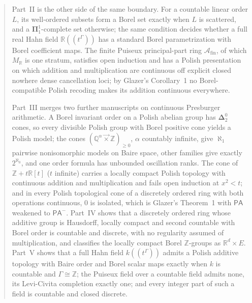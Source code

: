 \documentclass[11pt]{article}
\numberwithin{equation}{section}
\theoremstyle{definition}
\theoremstyle{remark}
\newcommand{\Z}{\mathbb Z}
\newcommand{\Q}{\mathbb Q}
\newcommand{\R}{\mathbb R}
\newcommand{\lex}{\mathbin{\overrightarrow\times}}
\newcommand{\MR}{M_{\R}}
\newcommand{\Dtwo}{\boldsymbol{\Delta}^{0}_{2}}
\newcommand{\A}{\mathcal A_{\mathrm{fin}}}
\begin{document}
\begin{titlepage}
\begin{minipage}{\textwidth}
\begin{abstract}
Part~II is the other side of the same boundary. For a countable linear
order $L$, its well-ordered subsets form a Borel set exactly when $L$ is
scattered, and a $\boldsymbol\Pi^1_1$-complete set otherwise; the same
condition decides whether a full real Hahn field $\R((t^\Gamma))$ has a
standard Borel parametrization with Borel coefficient maps. The finite
Puiseux principal-part ring $\A$, of which $\MR$ is one stratum, satisfies
open induction and has a Polish presentation on which addition and
multiplication are continuous off explicit closed nowhere dense cancellation
loci; by Glazer's Corollary~1 no Borel-compatible Polish recoding makes its
addition continuous everywhere.

Part~III merges two further manuscripts on continuous Presburger arithmetic.
A Borel invariant order on a Polish abelian group has $\Dtwo$ cones, so
every divisible Polish group with Borel positive cone yields a Polish model;
the cones $(\Q^\alpha\lex\Z)_{\ge0}$, $\alpha$ countably infinite, give
$\aleph_1$ pairwise nonisomorphic models on Baire space, other families give
exactly $2^{\aleph_0}$, and one order formula has unbounded oscillation ranks.
The cone of $\Z+t\R[t]$ ($t$ infinite) carries a locally compact Polish
topology with continuous addition and multiplication and fails open
induction at $x^2<t$; and in every Polish topological cone of a discretely
ordered ring with both operations continuous, $0$ is isolated, which is
Glazer's Theorem~1 with $\mathsf{PA}$ weakened to $\mathsf{PA}^-$.
Part~IV shows that a discretely ordered ring whose additive group is
Hausdorff, locally compact and second countable with Borel order is
countable and discrete, with no regularity assumed of multiplication, and
classifies the locally compact Borel $\Z$-groups as $\R^d\times E$. Part~V
shows that a full Hahn field $k((t^\Gamma))$ admits a Polish additive topology
with Baire order and Borel scalar maps exactly when $k$ is countable and
$\Gamma\cong\Z$; the Puiseux field over a countable field admits none, its
Levi-Civita completion exactly one; and every integer part of such a field is
countable and closed discrete.


\end{abstract}
\end{minipage}
\end{titlepage}
\end{document}
